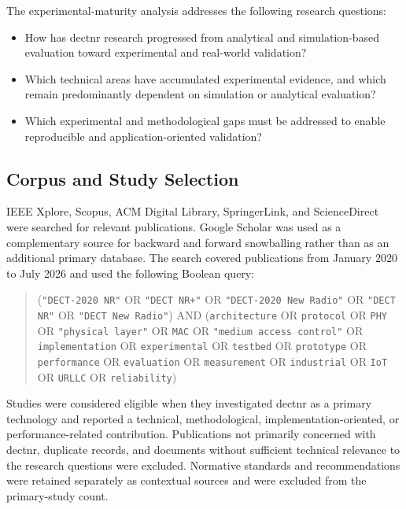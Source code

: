 \documentclass[conference]{IEEEtran}
\begin{document}
The experimental-maturity analysis addresses the following research
questions:

\begin{itemize}
    \item[\textbf{RQ1}] How has \gls{dectnr} research progressed from
    analytical and simulation-based evaluation toward experimental and
    real-world validation?

    \item[\textbf{RQ2}] Which technical areas have accumulated
    experimental evidence, and which remain predominantly dependent on
    simulation or analytical evaluation?

    \item[\textbf{RQ3}] Which experimental and methodological gaps must
    be addressed to enable reproducible and application-oriented
    validation?
\end{itemize}

\subsection{Corpus and Study Selection}
\label{subsec:corpus}

IEEE Xplore, Scopus, ACM Digital Library, SpringerLink, and
ScienceDirect were searched for relevant publications. Google Scholar
was used as a complementary source for backward and forward
snowballing rather than as an additional primary database. The search
covered publications from January 2020 to July 2026 and used the
following Boolean query:

\begin{quote}
\footnotesize
(\texttt{"DECT-2020 NR"} OR \texttt{"DECT NR+"} OR
\texttt{"DECT-2020 New Radio"} OR \texttt{"DECT NR"} OR
\texttt{"DECT New Radio"}) AND
(\texttt{architecture} OR \texttt{protocol} OR \texttt{PHY} OR
\texttt{"physical layer"} OR \texttt{MAC} OR
\texttt{"medium access control"} OR \texttt{implementation} OR
\texttt{experimental} OR \texttt{testbed} OR \texttt{prototype} OR
\texttt{performance} OR \texttt{evaluation} OR \texttt{measurement} OR
\texttt{industrial} OR \texttt{IoT} OR \texttt{URLLC} OR
\texttt{reliability})
\end{quote}

Studies were considered eligible when they investigated
\gls{dectnr} as a primary technology and reported a technical,
methodological, implementation-oriented, or performance-related
contribution. Publications not primarily concerned with
\gls{dectnr}, duplicate records, and documents without sufficient
technical relevance to the research questions were excluded.
Normative standards and recommendations were retained separately as
contextual sources and were excluded from the primary-study count.
\end{document}

